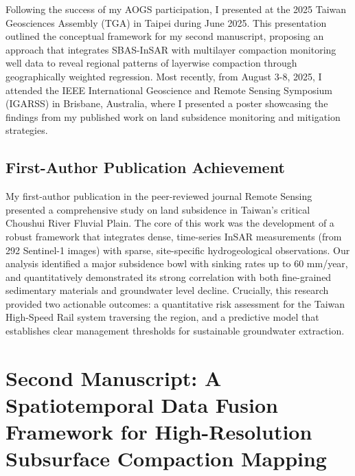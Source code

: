 \documentclass[12pt, a4paper]{article}
\begin{document}
	Following the success of my AOGS participation, I presented at the 2025 Taiwan Geosciences Assembly (TGA) in Taipei during June 2025. This presentation outlined the conceptual framework for my second manuscript, proposing an approach that integrates SBAS-InSAR with multilayer compaction monitoring well data to reveal regional patterns of layerwise compaction through geographically weighted regression. Most recently, from August 3-8, 2025, I attended the IEEE International Geoscience and Remote Sensing Symposium (IGARSS) in Brisbane, Australia, where I presented a poster showcasing the findings from my published work on land subsidence monitoring and mitigation strategies.
	
	\subsection{First-Author Publication Achievement}
	
	My first-author publication in the peer-reviewed journal Remote Sensing presented a comprehensive study on land subsidence in Taiwan's critical Choushui River Fluvial Plain. The core of this work was the development of a robust framework that integrates dense, time-series InSAR measurements (from 292 Sentinel-1 images) with sparse, site-specific hydrogeological observations. Our analysis identified a major subsidence bowl with sinking rates up to 60 mm/year, and quantitatively demonstrated its strong correlation with both fine-grained sedimentary materials and groundwater level decline. Crucially, this research provided two actionable outcomes: a quantitative risk assessment for the Taiwan High-Speed Rail system traversing the region, and a predictive model that establishes clear management thresholds for sustainable groundwater extraction.
	

\section{Second Manuscript: A Spatiotemporal Data Fusion Framework for High-Resolution Subsurface Compaction Mapping}
\end{document}
